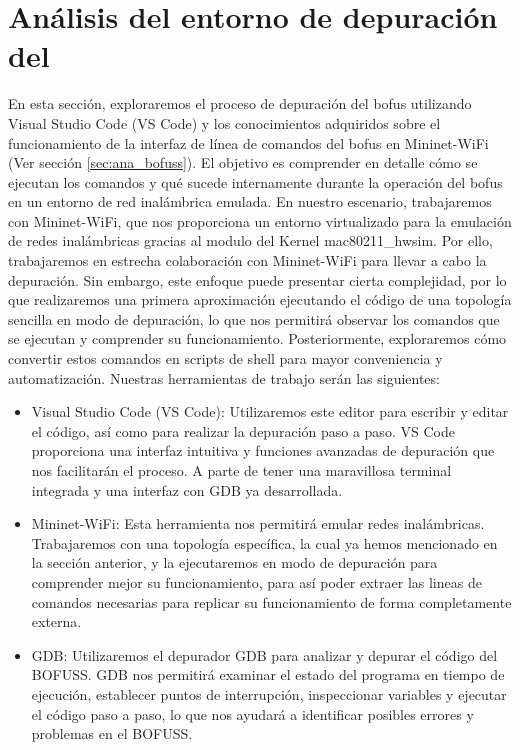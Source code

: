 \section{Análisis del entorno de depuración del }
\label{sec:ana_gdb}

En esta sección, exploraremos el proceso de depuración del \gls{bofus} utilizando Visual Studio Code (VS Code) y los conocimientos adquiridos sobre el funcionamiento de la interfaz de línea de comandos  del \gls{bofus} en Mininet-WiFi (Ver sección \ref{sec:ana_bofuss}). El objetivo es comprender en detalle cómo se ejecutan los comandos y qué sucede internamente durante la operación del \gls{bofus} en un entorno de red inalámbrica emulada. En nuestro escenario, trabajaremos con Mininet-WiFi, que nos proporciona un entorno virtualizado para la emulación de redes inalámbricas gracias al modulo del Kernel mac80211\_hwsim. Por ello, trabajaremos en estrecha colaboración con Mininet-WiFi para llevar a cabo la depuración. Sin embargo, este enfoque puede presentar cierta complejidad, por lo que realizaremos una primera aproximación ejecutando el código de una topología sencilla en modo de depuración, lo que nos permitirá observar los comandos que se ejecutan y comprender su funcionamiento. Posteriormente, exploraremos cómo convertir estos comandos en scripts de shell para mayor conveniencia y automatización. Nuestras herramientas de trabajo serán las siguientes:\\

\begin{itemize}
    \item Visual Studio Code (VS Code): Utilizaremos este editor para escribir y editar el código, así como para realizar la depuración paso a paso. VS Code proporciona una interfaz intuitiva y funciones avanzadas de depuración que nos facilitarán el proceso. A parte de tener una maravillosa terminal integrada y una interfaz con GDB ya desarrollada.

    \item Mininet-WiFi: Esta herramienta nos permitirá emular redes inalámbricas. Trabajaremos con una topología específica, la cual ya hemos mencionado en la sección anterior, y la ejecutaremos en modo de depuración para comprender mejor su funcionamiento, para así poder extraer las lineas de comandos necesarias para replicar su funcionamiento de forma completamente externa.

    \item GDB: Utilizaremos el depurador GDB para analizar y depurar el código del BOFUSS. GDB nos permitirá examinar el estado del programa en tiempo de ejecución, establecer puntos de interrupción, inspeccionar variables y ejecutar el código paso a paso, lo que nos ayudará a identificar posibles errores y problemas en el BOFUSS.
\end{itemize}

